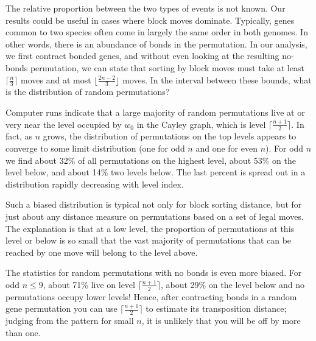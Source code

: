 \documentclass[11pt]{amsart} %
\begin{document}
The relative proportion between the two types of events is not known.
Our results could be useful in cases where block moves dominate.
Typically, genes common to two species often come in largely the same order
in both genomes. In other words, there is an abundance of bonds in
the permutation. In our analysis, we first contract bonded genes,
and without even looking at the resulting no-bonds permutation, we
can state that sorting by block moves must take at least $\lceil
\frac{n}{3} \rceil$ moves and at most
$\lfloor\frac{2n-2}{3}\rfloor$ moves.
In the interval between these bounds, what is the distribution
of random permutations?

Computer runs indicate that a large majority of random permutations live 
at or very
near the level occupied by $w_0$ in the Cayley graph, which is level
$\lceil\frac{n+1}{2}\rceil$. 
In fact, as $n$ grows, the distribution of permutations on 
the top levels appears to converge to some limit distribution
(one for odd $n$ and one for even $n$).
For odd $n$ we find about 32\% of all permutations on the highest level, 
about 53\% on the level below, and about 14\% two levels below. 
The last percent is spread
out in a distribution rapidly decreasing with level index. 

Such a biased distribution is typical not only for block sorting
distance, but for just about any distance measure on permutations
based on a set of legal moves.
The explanation is that at a low level, the proportion of permutations
at this level or below is so small that the vast majority of 
permutations that can be reached by one move will belong to the level
above.

The statistics for random permutations with no bonds is even more biased.
For odd $n\le 9$, about 71\% live on level
$\lceil\frac{n+1}{2}\rceil$, about 29\% on the
level below and no permutations occupy lower levels!  
Hence, after contracting bonds in a
random gene permutation you can use $\lceil\frac{n+1}{2}\rceil$ to
estimate its transposition distance; judging from the pattern for small
$n$, it is unlikely that you will be off by more than one.
%
\end{document}
